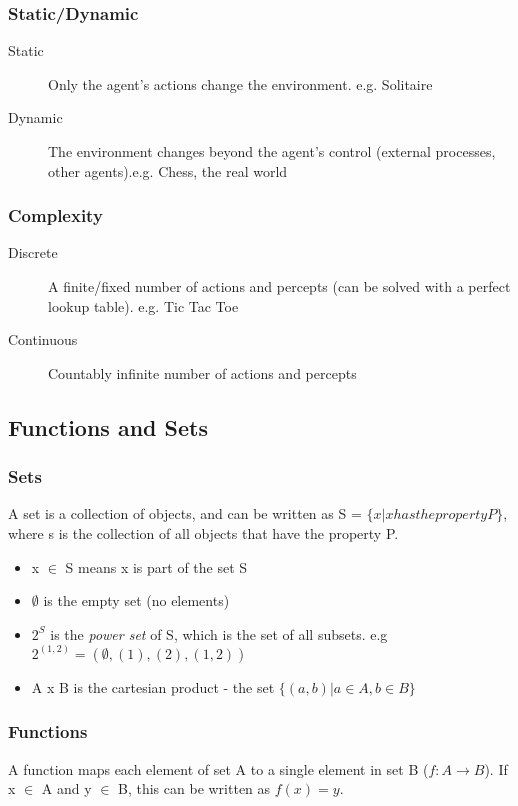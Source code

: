 \subsubsection{Static/Dynamic}
\begin{description}
    \item [Static] Only the agent's actions change the environment. e.g. Solitaire
    \item[Dynamic] The environment changes beyond the agent's control (external processes, other agents).e.g. Chess, the real world
\end{description}

\subsubsection{Complexity}
\begin{description}
    \item [Discrete] A finite/fixed number of actions and percepts (can be solved with a perfect lookup table). e.g. Tic Tac Toe
    \item[Continuous] Countably infinite number of actions and percepts
\end{description}

\subsection{Functions and Sets}

\subsubsection{Sets}
A set is a collection of objects, and can be written as S = $\{x | x has the property P\}$, where s is the collection of all objects that have the property P.

\begin{itemize}
    \item x $\in$ S means x is part of the set S
    \item $\emptyset$ is the empty set (no elements)
    \item $2^S$ is the \emph{power set} of S, which is the set of all subsets. e.g $2^{(1,2)} = (\emptyset,(1),(2),(1,2))$
    \item A x B is the cartesian product - the set $\{(a,b) | a \in A, b \in B\}$
\end{itemize}

\subsubsection{Functions}
A function maps each element of set A to a single element in set B ($f:A \longrightarrow B$). If x $\in$ A and y $\in$ B, this can be written as $f(x) = y$.

